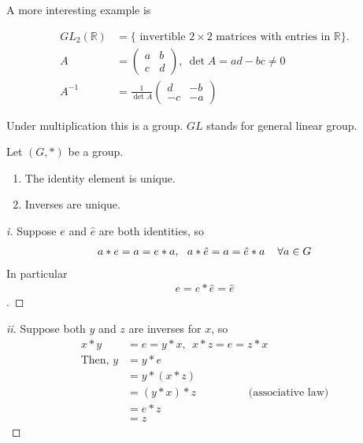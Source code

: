A more interesting example is

\begin{example}
\protect\hypertarget{exm:glg}{}\label{exm:glg}\begin{align*}
    GL_2 (\mathbb{R}) &= \{ \text{ invertible $2 \times 2$ matrices with entries in } \mathbb{R} \}. \\
    A &= \begin{pmatrix}
    a & b \\
    c & d
    \end{pmatrix},\ \det A = ad - bc \neq 0  \\
    A^{-1} &= \frac{1}{\det A} \begin{pmatrix}
    d & -b \\
    -c & -a
    \end{pmatrix}
\end{align*}

Under multiplication this is a group. \(GL\) stands for general linear group.
\end{example}

\begin{lemma}
\protect\hypertarget{lem:one}{}\label{lem:one}

Let \((G, *)\) be a group.

\begin{enumerate}
\def\labelenumi{\roman{enumi}.}
\tightlist
\item
  The identity element is unique.
\item
  Inverses are unique.
\end{enumerate}

\end{lemma}

\begin{proof}[i]
Suppose \(e\) and \(\hat{e}\) are both identities, so
\begin{align*}
    a * e = a = e * a,\ \ a * \hat{e} = a = \hat{e} * a \hspace{0.4cm }\forall a \in G \\
\end{align*}
In particular \begin{align*}
    e = e * \hat{e} = \hat{e}
\end{align*}.
\end{proof}

\begin{proof}[ii]
Suppose both \(y\) and \(z\) are inverses for \(x\), so
\begin{align*}
    x * y &= e = y * x,\ \ x * z = e = z * x \\
    \text{Then, } y &= y * e \\
    &= y * (x * z) \\
    &= (y * x) * z \hspace{2cm} \text{(associative law)} \\
    &= e * z \\
    &= z
\end{align*}
\end{proof}

